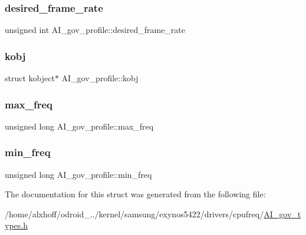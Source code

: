 \subsubsection{\texorpdfstring{desired\+\_\+frame\+\_\+rate}{desired\_frame\_rate}}
{\footnotesize\ttfamily unsigned int A\+I\+\_\+gov\+\_\+profile\+::desired\+\_\+frame\+\_\+rate}

\mbox{\label{structAI__gov__profile_a126166c7cea02562d10c95919fbcd37b}} 
\subsubsection{\texorpdfstring{kobj}{kobj}}
{\footnotesize\ttfamily struct kobject$\ast$ A\+I\+\_\+gov\+\_\+profile\+::kobj}

\mbox{\label{structAI__gov__profile_a329f428d588d3b19bb5bbac5001a9c61}} 
\subsubsection{\texorpdfstring{max\+\_\+freq}{max\_freq}}
{\footnotesize\ttfamily unsigned long A\+I\+\_\+gov\+\_\+profile\+::max\+\_\+freq}

\mbox{\label{structAI__gov__profile_a97f43b9adfda1be183ac0632624abff8}} 
\subsubsection{\texorpdfstring{min\+\_\+freq}{min\_freq}}
{\footnotesize\ttfamily unsigned long A\+I\+\_\+gov\+\_\+profile\+::min\+\_\+freq}



The documentation for this struct was generated from the following file\+:\begin{DoxyCompactItemize}
\item 
/home/alxhoff/odroid\+\_../kernel/samsung/exynos5422/drivers/cpufreq/\hyperlink{AI__gov__types_8h}{A\+I\+\_\+gov\+\_\+types.\+h}\end{DoxyCompactItemize}
